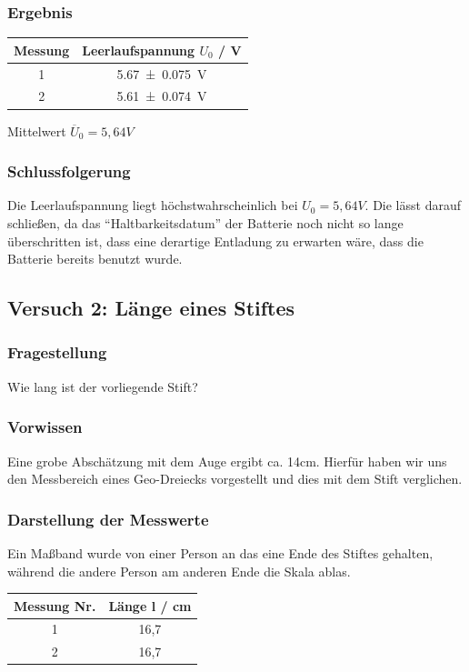 \documentclass[
	a4paper,
	12pt,
	pagesize,
	ngerman
]{scrartcl}
\begin{document}
	\subsubsection{Ergebnis}
	\begin{tabular}{| c | c |}
		\hline
	Messung & Leerlaufspannung $U_0$ / \si{V}\\ \hline
	1 & \SI{5,67 +- 0,075}{\V}\\ %
	2 & \SI{5,61 +- 0,074}{\V}\\ \hline
	\end{tabular}
	Mittelwert $\overline{U}_0= 5,64 \si{V}$ 
	\subsubsection{Schlussfolgerung}
	Die Leerlaufspannung liegt höchstwahrscheinlich bei $U_0=5,64\si{V}$. Die lässt darauf schließen, da das \enquote{Haltbarkeitsdatum} der Batterie noch nicht so lange überschritten ist, dass eine derartige Entladung zu erwarten wäre, dass die Batterie bereits benutzt wurde. %
	
	\newpage
	\subsection{Versuch 2: Länge eines Stiftes}
	
	\subsubsection{Fragestellung}
	Wie lang ist der vorliegende Stift?
	\subsubsection{Vorwissen}
	Eine grobe Abschätzung mit dem Auge ergibt ca. 14\si{cm}. Hierfür haben wir uns den Messbereich eines Geo-Dreiecks vorgestellt und dies mit dem Stift verglichen.
	\subsubsection{Darstellung der Messwerte}
	Ein Maßband wurde von einer Person an das eine Ende des Stiftes gehalten, während die andere Person am anderen Ende die Skala ablas.
	\begin{tabular}{| c | c |}
		\hline
		Messung Nr. & Länge l  / \si{cm}\\ \hline
		1 & 16,7\\
		2 & 16,7\\ \hline
	\end{tabular}
\end{document}
